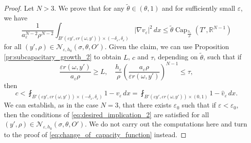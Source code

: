 \documentclass{article}
\numberwithin{equation}{section}
\theoremstyle{definition}
\theoremstyle{remark}
\newcommand{\cpct}{\operatorname{Cap}}
\begin{document}
\begin{proof}
    Let $N > 3$. We prove that for any $\tilde{\theta} \in (\theta, 1)$ and for sufficiently small $\varepsilon$, we have
    \begin{equation} \label{eq:change_of_capacity_function}
        \frac{1}{a_\varepsilon^{N - 2} \rho^{N - 2}} \int_{B'(\varepsilon y', \varepsilon r(\omega, y')) \times (-\delta_\varepsilon, \delta_\varepsilon)} |\nabla v_\varepsilon|^2 \, dx \le \tilde{\theta} \cpct_{\frac{h_\varepsilon}{\rho}}(T', \mathbb{R}^{N - 1})
    \end{equation}
    for all $(y', \rho) \in \mathcal{N}_{\varepsilon, h_0}(\sigma, \theta, O')$. Given the claim, we can use Proposition \ref{pr:subcapacitary_growth_2} to obtain $L$, $c$ and $\tau$, depending on $\tilde{\theta}$, such that if
    \begin{equation} \label{eq:desired_implication_2}
        \frac{\varepsilon r(\omega, y')}{a_\varepsilon \rho} \ge L, \quad \frac{h_\varepsilon}{\rho} \left(\frac{a_\varepsilon \rho}{\varepsilon r(\omega, y')}\right)^{N - 1} \le \tau,
    \end{equation}
    then
    \[
    c < \fint_{B'(\varepsilon y', \varepsilon r(\omega, y')) \times (-\delta_\varepsilon, \delta_\varepsilon)} 1 - v_\varepsilon \, dx = \fint_{B'(\varepsilon y', \varepsilon r(\omega, y')) \times (0, 1)} 1 - \hat{v}_\varepsilon \, dx.
    \]
    We can establish, as in the case $N = 3$, that there exists $\varepsilon_0$ such that if $\varepsilon < \varepsilon_0$, then the conditions of \eqref{eq:desired_implication_2} are satisfied for all $(y', \rho) \in \mathcal{N}_{\varepsilon, h_0}(\sigma, \theta, O')$. We do not carry out the computations here and turn to the proof of \eqref{eq:change_of_capacity_function} instead.


\end{proof}
\end{document}
